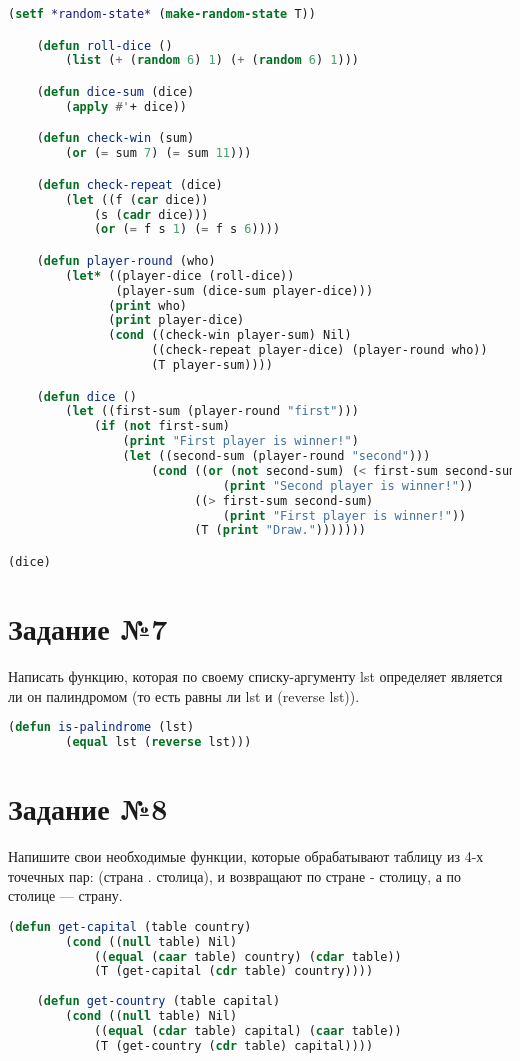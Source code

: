 \begin{lstlisting}[language=Lisp]
	(setf *random-state* (make-random-state T))

	(defun roll-dice ()
		(list (+ (random 6) 1) (+ (random 6) 1)))

	(defun dice-sum (dice)
		(apply #'+ dice))

	(defun check-win (sum)
		(or (= sum 7) (= sum 11)))

	(defun check-repeat (dice)
		(let ((f (car dice))
			(s (cadr dice)))
			(or (= f s 1) (= f s 6))))

	(defun player-round (who)
		(let* ((player-dice (roll-dice))
			   (player-sum (dice-sum player-dice)))
			  (print who)
			  (print player-dice)
			  (cond ((check-win player-sum) Nil)
					((check-repeat player-dice) (player-round who))
					(T player-sum))))

	(defun dice ()
		(let ((first-sum (player-round "first")))
			(if (not first-sum)
				(print "First player is winner!")
				(let ((second-sum (player-round "second")))
					(cond ((or (not second-sum) (< first-sum second-sum))
							  (print "Second player is winner!"))
						  ((> first-sum second-sum)
							  (print "First player is winner!"))
						  (T (print "Draw.")))))))

(dice)
\end{lstlisting}

\section{Задание №7}

Написать функцию, которая по своему списку-аргументу lst определяет
является ли он палиндромом (то есть равны ли lst и (reverse lst)).

\begin{lstlisting}[language=Lisp]
	(defun is-palindrome (lst)
		(equal lst (reverse lst)))
\end{lstlisting}

\section{Задание №8}

Напишите свои необходимые функции, которые обрабатывают таблицу из
4-х точечных пар:
(страна . столица), и возвращают по стране - столицу, а по столице —
страну.

\begin{lstlisting}[language=Lisp]
	(defun get-capital (table country)
		(cond ((null table) Nil)
			((equal (caar table) country) (cdar table))
			(T (get-capital (cdr table) country))))
			
	(defun get-country (table capital)
		(cond ((null table) Nil)
			((equal (cdar table) capital) (caar table))
			(T (get-country (cdr table) capital))))
\end{lstlisting}

